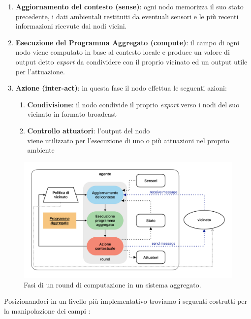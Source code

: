 \documentclass[12pt,a4paper,openright,twoside]{book}
\begin{document}
\begin{enumerate}
    \item \textbf{Aggiornamento del contesto (sense)}: ogni nodo memorizza il suo stato precedente, i dati ambientali restituiti da eventuali sensori e le più recenti informazioni ricevute dai nodi vicini.
    \item \textbf{Esecuzione del Programma Aggregato (compute)}: il campo di ogni nodo viene computato in base al contesto locale e produce un valore di output detto \textit{export} da condividere con il proprio vicinato ed un output utile per l'attuazione.
    \item \textbf{Azione (inter-act)}: in questa fase il nodo effettua le seguenti azioni:
    \begin{enumerate}
        \item \textbf{Condivisione}: il nodo condivide il proprio \textit{export} verso i nodi del suo vicinato in formato broadcast
        \item \textbf{Controllo attuatori}: l'output del nodo \\ viene 
        utilizzato per l'esecuzione di uno o più attuazioni nel proprio ambiente
    \end{enumerate}
\end{enumerate}

\begin{figure}
    \centering
    \includegraphics[width=.9\linewidth]{figures/sca-round.pdf}
    \caption{Fasi di un round di computazione in un sistema aggregato.}
    \label{fig:sca-round}
\end{figure}

Posizionandoci in un livello più implementativo troviamo i seguenti costrutti per la manipolazione dei campi \cite{Pianini2017}: 
\end{document}
